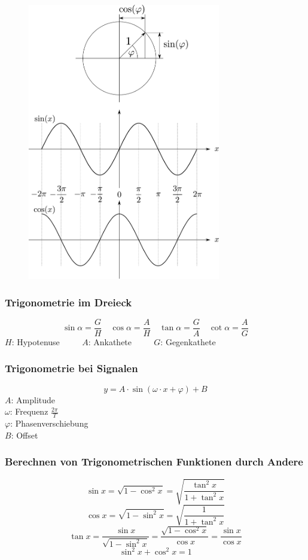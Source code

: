 \begin{figure}[h!]
\centering
\includegraphics[width=0.75\textwidth]{einheitskreis.pdf}
\end{figure}

\subsubsection{Trigonometrie im Dreieck}
\[ \boxed{\sin\alpha=\frac{G}{H}} \quad \boxed{\cos\alpha=\frac{A}{H}} 
\quad \boxed{\tan\alpha=\frac{G}{A}} \quad \boxed{\cot\alpha=\frac{A}{G}} \]
$H$: Hypotenuse $\qquad$ $A$: Ankathete $\qquad$ $G$: Gegenkathete

\subsubsection{Trigonometrie bei Signalen}
\[ \boxed{y= A \cdot \sin(\omega \cdot x + \varphi) + B} \]
$A$: Amplitude\\
$\omega$: Frequenz $\frac{2\pi}{T}$\\
$\varphi$: Phasenverschiebung\\
$B$: Offset

\subsubsection{Berechnen von Trigonometrischen Funktionen durch Andere}
\[ \boxed{\sin x = \sqrt{1-\cos^2x} = \sqrt{\frac{\tan^2x}{1+\tan^2x}}} \]
\[ \boxed{\cos x = \sqrt{1-\sin^2x} = \sqrt{\frac{1}{1+\tan^2x}}} \]
\[ \boxed{\tan x = \frac{\sin x}{\sqrt{1-\sin^2x}} 
= \frac{\sqrt{1-\cos^2x}}{\cos x} = \frac{\sin x}{\cos x}} \]
\[ \boxed{\sin^2 x + \cos^2 x = 1} \]

